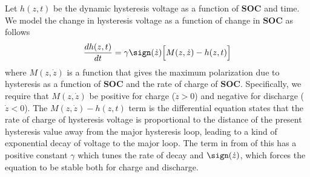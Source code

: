 \documentclass[12pt,a4paper,oneside]{book}
\begin{document}
\begin{onehalfspace}
Let $h(z,t)$ be the dynamic hysteresis voltage as a function of $\mathbf{SOC}$ and time. We model the change in hysteresis voltage as a function of change in $\mathbf{SOC}$ as follows
\begin{equation}
	\frac{dh(z,t)}{dt} = \gamma\sign(\dot{z})\Big[M(z,\dot{z})-h(z,t)\Big]
\end{equation}
where $M(z,\dot{z})$ is a function that gives the maximum polarization due to hysteresis as a function of $\mathbf{SOC}$ and the rate of charge of $\mathbf{SOC}$.
Specifically, we require that $M(z,\dot{z})$ be positive for charge ($\dot{z}>0$) and negative for discharge ($\dot{z}<0$). The $M(z,\dot{z})-h(z,t)$ term is the differential equation states that the rate of charge of hysteresis voltage is proportional to the distance of the present hysteresis value away from the major hysteresis loop, leading to a kind of exponential decay of voltage to the major loop. The term in from of this has a positive constant $\gamma$ which tunes the rate of decay and $\sign(\dot{z})$, which forces the equation to be stable both for charge and discharge.


\end{onehalfspace}
\end{document}
